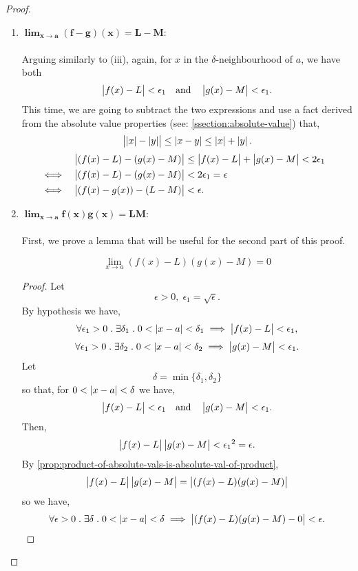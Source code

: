\documentclass[../MathsNotesBase.tex]{subfiles}
\begin{document}
{\begin{proof}
\begin{enumerate}[label=(\roman*)]
{\begin{align*}
					\end{align*}
					\bigskip
				}
				\item{${\bm{ \lim_{x \to a} (f - g)(x) = L - M }}$:\\\\
					Arguing similarly to (iii), again, for $x$ in the $\delta$-neighbourhood of $a$, we have both
					\[ \left\lvert f(x) - L\right\rvert < \epsilon_1 \hspace{10pt}\text{and}\hspace{10pt} \left\lvert g(x) - M\right\rvert < \epsilon_1. \]
					This time, we are going to subtract the two expressions and use a fact derived from the absolute value properties (see: \ref{ssection:absolute-value}) that,
					\[ \left\lvert\left\lvert x\right\rvert - \left\lvert y\right\rvert\right\rvert \leq \left\lvert x - y\right\rvert \leq \left\lvert x\right\rvert + \left\lvert y\right\rvert. \]
					\begin{align*}
					&& \left\lvert(f(x) - L) - (g(x) - M)\right\rvert &\leq \left\lvert f(x) - L\right\rvert + \left\lvert g(x) - M\right\rvert < 2\epsilon_1 \\
					&\iff & \left\lvert(f(x) - L) - (g(x) - M)\right\rvert &<  2\epsilon_1 = \epsilon &\text{\scriptsize{}}\\
					&\iff & \left\lvert(f(x) - g(x)) - (L - M)\right\rvert &<  \epsilon. &\text{\scriptsize{}}
					\end{align*}
					\bigskip
				}
				\item{${\bm{ \lim_{x \to a} f(x)g(x) = LM }}$:\\\\
					First, we prove a lemma that will be useful for the second part of this proof.
					\begin{lemma}
						\[ \lim_{x \to a} (f(x) - L)(g(x) - M) = 0 \]
					\end{lemma}
					\begin{proof}
						Let 
						\[ \epsilon > 0,\; \epsilon_1 = \sqrt{\epsilon}.\]
						By hypothesis we have,
						\[ \forall \epsilon_1 > 0 \;.\; \exists \delta_1 \;.\; 0 < \left\lvert x - a\right\rvert < \delta_1 \implies \left\lvert f(x) - L\right\rvert < \epsilon_1, \]
						\[ \forall \epsilon_1 > 0 \;.\; \exists \delta_2 \;.\; 0 < \left\lvert x - a\right\rvert < \delta_2 \implies \left\lvert g(x) - M\right\rvert < \epsilon_1. \]
						Let 
						\[ \delta = \min \{\delta_1,\delta_2\} \]
						so that, for ${ 0 < \left\lvert x - a\right\rvert < \delta }$ we have,
						\[  \left\lvert f(x) - L\right\rvert < \epsilon_1 \hspace{10pt}\text{and}\hspace{10pt} \left\lvert g(x) - M\right\rvert < \epsilon_1. \]
						Then,
						\[ \left\lvert f(x) - L\right\rvert\left\lvert g(x) - M\right\rvert < {\epsilon_1}^2 = \epsilon. \]
						By \autoref{prop:product-of-absolute-vals-is-absolute-val-of-product},
						\[ \left\lvert f(x) - L\right\rvert\left\lvert g(x) - M\right\rvert = \left\lvert(f(x) - L)(g(x) - M)\right\rvert \]
						so we have,
						\[ \forall \epsilon > 0 \;.\; \exists \delta \;.\; 0 < \left\lvert x - a\right\rvert < \delta \implies \left\lvert(f(x) - L)(g(x) - M) - 0\right\rvert < \epsilon. \]

\end{proof}}
\end{enumerate}
\end{proof}}
\end{document}

